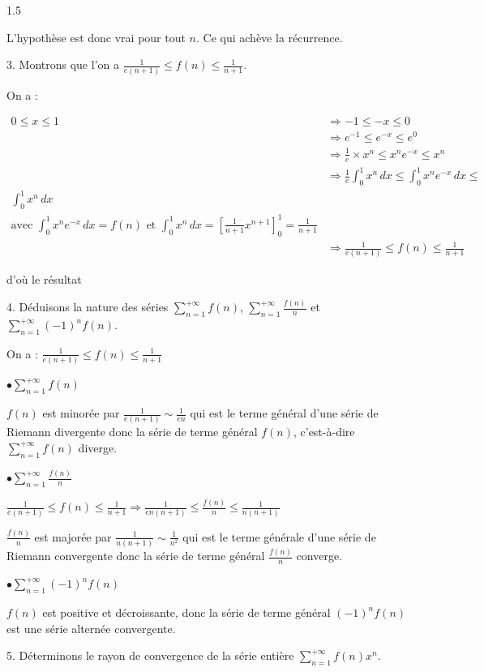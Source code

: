 \documentclass[12pt]{article}
\begin{document}
\begin{spacing}{1.5}
 
 L'hypothèse est donc vrai pour tout $n$. Ce qui achève la récurrence.
 
 3. Montrons que l'on a $\frac{1}{e(n+1)}\leq f(n)\leq \frac{1}{n+1}$.
 
 On a :
 

\begin{align*}
0 \leq x \leq 1 &\Rightarrow -1 \leq -x \leq 0 \\
&\Rightarrow e^{-1} \leq e^{-x} \leq e^{0} \\
&\Rightarrow \frac{1}{e} \times x^n \leq x^n e^{-x} \leq x^n \\
&\Rightarrow \frac{1}{e} \int_{0}^{1} x^n \, dx \leq\int_{0}^{1} x^n e^{-x} \, dx \leq \\
\int_{0}^{1} x^n \, dx \\
\text{avec } \int_{0}^{1} x^n e^{-x} \, dx = f(n) \text{ et } \int_{0}^{1} x^n \, dx = \left[ \frac{1}{n+1} x^{n+1} \right]_{0}^{1} = \frac{1}{n+1} \\
&\Rightarrow \frac{1}{e(n+1)} \leq f(n) \leq \frac{1}{n+1}
\end{align*}

 d'où le résultat
 
 4. Déduisons la nature des séries $\sum_{n=1}^{+\infty}f(n)$, $\sum_{n=1}^{+\infty}\frac{f(n)}{n}$ et $\sum_{n=1}^{+\infty}(-1)^nf(n)$.
 
 On a : $\frac{1}{e(n+1)}\leq f(n)\leq \frac{1}{n+1}$
 
 
 \medskip
 $\bullet \sum_{n=1}^{+\infty}f(n)$

$f(n)$ est minorée par $\frac{1}{e(n+1)}\sim \frac{1}{en}$  qui est le terme général d'une série de Riemann divergente donc la série de terme général $f(n)$, c'est-à-dire $\sum_{n=1}^{+\infty}f(n)$ diverge.
 
 \medskip
 $\bullet \sum_{n=1}^{+\infty}\frac{f(n)}{n}$
 
 $\frac{1}{e(n+1)}\leq f(n)\leq \frac{1}{n+1}\Rightarrow \frac{1}{en(n+1)}\leq \frac{f(n)}{n}\leq \frac{1}{n(n+1)}$
 
 $\frac{f(n)}{n}$ est majorée par $\frac{1}{n(n+1)}\sim \frac{1}{n^2}$ qui est le terme générale d'une série de Riemann convergente donc la série de terme général $\frac{f(n)}{n}$ converge.
 
 $\bullet \sum_{n=1}^{+\infty}(-1)^nf(n)$
 
 $f(n)$ est positive et décroissante, donc la série de terme général $(-1)^nf(n)$ est une série alternée convergente.
 
 
 5. Déterminons le rayon de convergence de la série entière $\sum_{n=1}^{+\infty}f(n)x^n$.


\end{spacing}
\end{document}
